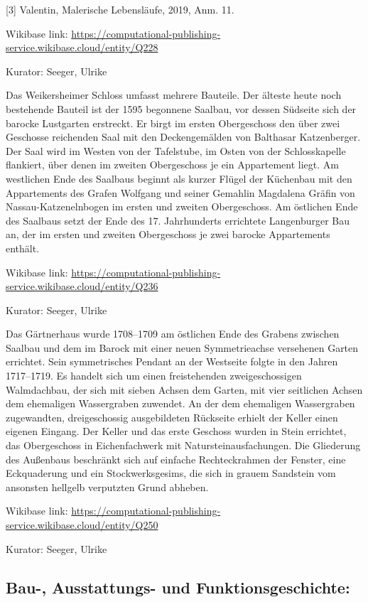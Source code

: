 \documentclass[
  letterpaper,
]{book}
\begin{document}
{[}3{]} Valentin, Malerische Lebensläufe, 2019, Anm. 11.

Wikibase link:
\url{https://computational-publishing-service.wikibase.cloud/entity/Q228}

Kurator: Seeger, Ulrike

Das Weikersheimer Schloss umfasst mehrere Bauteile. Der älteste heute
noch bestehende Bauteil ist der 1595 begonnene Saalbau, vor dessen
Südseite sich der barocke Lustgarten erstreckt. Er birgt im ersten
Obergeschoss den über zwei Geschosse reichenden Saal mit den
Deckengemälden von Balthasar Katzenberger. Der Saal wird im Westen von
der Tafelstube, im Osten von der Schlosskapelle flankiert, über denen im
zweiten Obergeschoss je ein Appartement liegt. Am westlichen Ende des
Saalbaus beginnt als kurzer Flügel der Küchenbau mit den Appartements
des Grafen Wolfgang und seiner Gemahlin Magdalena Gräfin von
Nassau-Katzenelnbogen im ersten und zweiten Obergeschoss. Am östlichen
Ende des Saalbaus setzt der Ende des 17. Jahrhunderts errichtete
Langenburger Bau an, der im ersten und zweiten Obergeschoss je zwei
barocke Appartements enthält.

Wikibase link:
\url{https://computational-publishing-service.wikibase.cloud/entity/Q236}

Kurator: Seeger, Ulrike

Das Gärtnerhaus wurde 1708--1709 am östlichen Ende des Grabens zwischen
Saalbau und dem im Barock mit einer neuen Symmetrieachse versehenen
Garten errichtet. Sein symmetrisches Pendant an der Westseite folgte in
den Jahren 1717--1719. Es handelt sich um einen freistehenden
zweigeschossigen Walmdachbau, der sich mit sieben Achsen dem Garten, mit
vier seitlichen Achsen dem ehemaligen Wassergraben zuwendet. An der dem
ehemaligen Wassergraben zugewandten, dreigeschossig ausgebildeten
Rückseite erhielt der Keller einen eigenen Eingang. Der Keller und das
erste Geschoss wurden in Stein errichtet, das Obergeschoss in
Eichenfachwerk mit Natursteinausfachungen. Die Gliederung des Außenbaus
beschränkt sich auf einfache Rechteckrahmen der Fenster, eine
Eckquaderung und ein Stockwerksgesims, die sich in grauem Sandstein vom
ansonsten hellgelb verputzten Grund abheben.

Wikibase link:
\url{https://computational-publishing-service.wikibase.cloud/entity/Q250}

Kurator: Seeger, Ulrike

\subsection{Bau-, Ausstattungs- und
Funktionsgeschichte:}\label{bau--ausstattungs--und-funktionsgeschichte-1}
\end{document}
